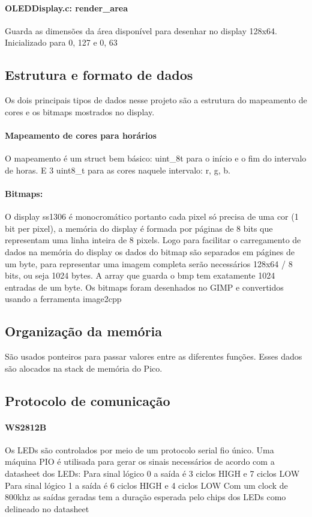 \documentclass[12pt]{article}
\begin{document}
\paragraph{OLEDDisplay.c: render\_area} Guarda as dimensões da área disponível para desenhar no display 128x64. Inicializado para 0, 127 e 0, 63

\subsection{Estrutura e formato de dados} Os dois principais tipos de dados nesse projeto são a estrutura do mapeamento de cores e os bitmaps mostrados no display.
\paragraph{Mapeamento de cores para horários} O mapeamento é um struct bem básico: uint\_8t para o início e o fim do intervalo de horas. E 3 uint8\_t para as cores naquele intervalo: r, g, b.
\paragraph{Bitmaps:} O display ss1306 é monocromático portanto cada pixel só precisa de uma cor (1 bit per pixel), a memória do display é formada por páginas de 8 bits que representam uma linha inteira de 8 pixels. Logo para facilitar o carregamento de dados na memória do display os dados do bitmap são separados em págines de um byte, para representar uma imagem completa serão necessários 128x64 / 8 bits, ou seja 1024 bytes. A array que guarda o bmp tem exatamente 1024 entradas de um byte. Os bitmaps foram desenhados no GIMP e convertidos usando a ferramenta image2cpp\cite{Bitmapconverter}

\subsection{Organização da memória}
São usados ponteiros para passar valores entre as diferentes funções. Esses dados são alocados na stack de memória do Pico.
\subsection{Protocolo de comunicação}
\paragraph{WS2812B} Os LEDs são controlados por meio de um protocolo serial fio único. Uma máquina PIO é utilisada para gerar os sinais necessários de acordo com a datasheet dos LEDs:
Para sinal lógico 0 a saída é 3 ciclos HIGH e 7 ciclos LOW
Para sinal lógico 1 a saída é 6 ciclos HIGH e 4 ciclos LOW
Com um clock de 800khz as saídas geradas tem a duração esperada pelo chips dos LEDs como delineado no datasheet \cite{WS2812Bdatasheet}
\end{document}
